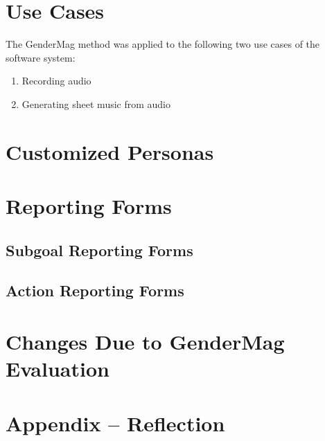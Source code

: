 \documentclass[12pt, titlepage]{article}
\begin{document}
\section{Use Cases}
The GenderMag method was applied to the following two use cases of the software system:
\begin{enumerate}
    \item Recording audio
    \item Generating sheet music from audio
\end{enumerate}

\section{Customized Personas}



\section{Reporting Forms}
\subsection{Subgoal Reporting Forms}



\subsection{Action Reporting Forms}




\section{Changes Due to GenderMag Evaluation}


\newpage
\section*{Appendix -- Reflection}
\end{document}
